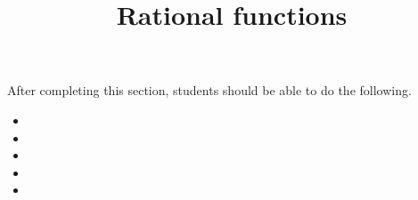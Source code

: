 \documentclass{ximera}
\title{Rational functions}
\begin{document}
\begin{abstract} 
\end{abstract}

\maketitle

\begin{sectionOutcomes}
After completing this section, students should be able to do the following.

\begin{itemize}
	\item 
	\item 
	\item 
        \item 
	\item 
\end{itemize}
\end{sectionOutcomes}
\end{document}
